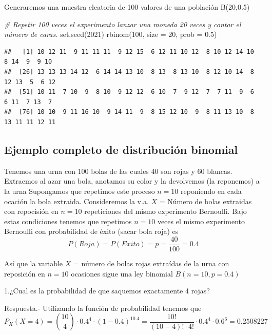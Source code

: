 \documentclass[
]{article}
\newenvironment{Shaded}{\begin{snugshade}}{\end{snugshade}}
\newcommand{\AttributeTok}[1]{\textcolor[rgb]{0.77,0.63,0.00}{#1}}
\newcommand{\CommentTok}[1]{\textcolor[rgb]{0.56,0.35,0.01}{\textit{#1}}}
\newcommand{\DecValTok}[1]{\textcolor[rgb]{0.00,0.00,0.81}{#1}}
\newcommand{\FloatTok}[1]{\textcolor[rgb]{0.00,0.00,0.81}{#1}}
\newcommand{\FunctionTok}[1]{\textcolor[rgb]{0.00,0.00,0.00}{#1}}
\newcommand{\NormalTok}[1]{#1}
\begin{document}
Generaremos una muestra eleatoria de 100 valores de una población
B(20,0.5)

\begin{Shaded}
\begin{Highlighting}[]
\CommentTok{\# Repetir 100 veces el experimento lanzar una moneda 20 veces y contar el número de caras.}
\FunctionTok{set.seed}\NormalTok{(}\DecValTok{2021}\NormalTok{)}
\FunctionTok{rbinom}\NormalTok{(}\DecValTok{100}\NormalTok{, }\AttributeTok{size =} \DecValTok{20}\NormalTok{, }\AttributeTok{prob =} \FloatTok{0.5}\NormalTok{)}
\end{Highlighting}
\end{Shaded}

\begin{verbatim}
##   [1] 10 12 11  9 11 11 11  9 12 15  6 12 11 10 12  8 10 12 14 10  8 14  9  9 10
##  [26] 13 13 13 14 12  6 14 14 13 10  8 13  8 13 10  8 12 10 14  8 12 13  5  6 12
##  [51] 10 11  7 10  9  8 10  9 12 12  6 10  7  9 12  7  7 11  9  6  6 11  7 13  7
##  [76] 10 10  9 11 16 10  9 14 11  9  8 15 12 10  9  8 11 13 10  8 13 11 11 12 11
\end{verbatim}

\hypertarget{ejemplo-completo-de-distribuciuxf3n-binomial}{%
\subsection{Ejemplo completo de distribución
binomial}\label{ejemplo-completo-de-distribuciuxf3n-binomial}}

Tenemos una urna con 100 bolas de las cuales 40 son rojas y 60 blancas.
Extraemos al azar una bola, anotamos su color y la devolvemos (la
reponemos) a la urna Supongamos que repetimos este proceso \(n=10\)
reponiendo en cada ocación la bola extraida. Consideremos la v.a. \(X\)
= Número de bolas extraidas con repocisión en \(n=10\) repeticiones del
mismo experimento Bernoulli. Bajo estas condiciones tenemos que
repetimos \(n=10\) veces el mismo experimento Bernoulli con probabilidad
de éxito (sacar bola roja) es
\[P(Roja) = P(Exito)=p=\dfrac{40}{100}=0.4\]

Así que la variable \(X\) = número de bolas rojas extraídas de la urna
con reposición en \(n=10\) ocasiones sigue una ley binomial
\(B(n=10,p=0.4)\)

1.¿Cual es la probabilidad de que saquemos exactamente 4 rojas?

Respuesta.- Utilizando la función de probabilidad tenemos que
\[P_X(X=4) = {10 \choose 4} \cdot 0.4^4 \cdot (1-0.4)^10.4 = \dfrac{10!}{(10-4)!\cdot 4!}\cdot 0.4^4 \cdot 0.6^6 = 0.2508227\]
\end{document}
